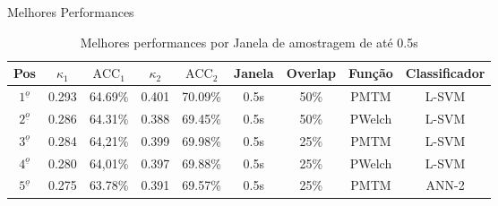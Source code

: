 \documentclass{beamer}
\begin{document}

\begin{frame}{Melhores Performances}
\color{black}
\centering

\begin{table}[h!]
	\caption{Melhores performances por Janela de amostragem de at\'e 0.5s}
	\scriptsize
	\begin{tabularx}{\textwidth}{c|c|c|c|c|c|c|c|c}		
		\hline\hline
		Pos&$\kappa_1$ &$\text{ACC}_1$&$\kappa_2$&$\text{ACC}_2$&Janela& Overlap&Fun\c{c}\~ao&Classificador  \\ \hline
		$1^{\underline{o}}$&0.293&64.69\%&0.401&70.09\%&0.5s&	50\%&PMTM&L-SVM \\ \hline 
		$2^{\underline{o}}$&0.286&64.31\%&0.388&69.45\%&0.5s&	50\%&PWelch&L-SVM \\ \hline
		$3^{\underline{o}}$&0.284&64,21\%&0.399&69.98\%&0.5s&25\%&PMTM&L-SVM \\ \hline
		$4^{\underline{o}}$&0.280&64,01\%&0.397&69.88\%&0.5s&25\%&PWelch&L-SVM \\ \hline
		$5^{\underline{o}}$&0.275&63.78\%&0.391&69.57\%&0.5s&	25\%&PMTM&ANN-2 \\ \hline
	\end{tabularx}
	\label{Tab:melhoresKappa125}
\end{table}

\end{frame}



\end{document}
